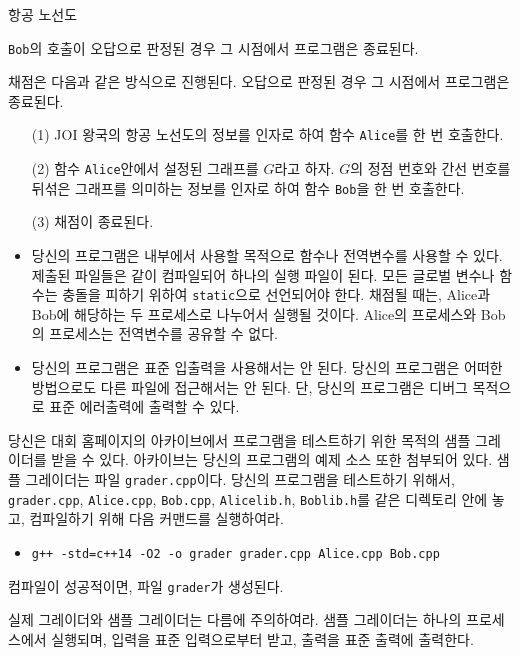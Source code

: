\begin{problem}{항공 노선도}
\begin{itemize}
	\texttt{Bob}의 호출이 오답으로 판정된 경우 그 시점에서 프로그램은 종료된다.
	
\end{itemize}


채점은 다음과 같은 방식으로 진행된다. 오답으로 판정된 경우 그 시점에서 프로그램은 종료된다.

\begin{enumerate}
	\item[(1)] JOI 왕국의 항공 노선도의 정보를 인자로 하여 함수 \texttt{Alice}를 한 번 호출한다.
	\item[(2)] 함수 \texttt{Alice}안에서 설정된 그래프를 $G$라고 하자. $G$의 정점 번호와 간선 번호를 뒤섞은 그래프를 의미하는 정보를 인자로 하여 함수 \texttt{Bob}을 한 번 호출한다.
	\item[(3)] 채점이 종료된다.
\end{enumerate}


\Notes

\begin{itemize}
	\item 당신의 프로그램은 내부에서 사용할 목적으로 함수나 전역변수를 사용할 수 있다. 제출된 파일들은 같이 컴파일되어 하나의 실행 파일이 된다. 모든 글로벌 변수나 함수는 충돌을 피하기 위하여 \texttt{static}으로 선언되어야 한다. 채점될 때는, Alice과 Bob에 해당하는 두 프로세스로 나누어서 실행될 것이다. Alice의 프로세스와 Bob의 프로세스는 전역변수를 공유할 수 없다.
	\item 당신의 프로그램은 표준 입출력을 사용해서는 안 된다. 당신의 프로그램은 어떠한 방법으로도 다른 파일에 접근해서는 안 된다. 단, 당신의 프로그램은 디버그 목적으로 표준 에러출력에 출력할 수 있다.
\end{itemize}

당신은 대회 홈페이지의 아카이브에서 프로그램을 테스트하기 위한 목적의 샘플 그레이더를 받을 수 있다. 아카이브는 당신의 프로그램의 예제 소스 또한 첨부되어 있다.
샘플 그레이더는 파일 \texttt{grader.cpp}이다. 당신의 프로그램을 테스트하기 위해서, \texttt{grader.cpp}, \texttt{Alice.cpp}, \texttt{Bob.cpp}, \texttt{Alicelib.h}, \texttt{Boblib.h}를 같은 디렉토리 안에 놓고, 컴파일하기 위해 다음 커맨드를 실행하여라.

\begin{itemize}
	\item \texttt{g++ -std=c++14 -O2 -o grader grader.cpp Alice.cpp Bob.cpp}
\end{itemize}

컴파일이 성공적이면, 파일 \texttt{grader}가 생성된다.

실제 그레이더와 샘플 그레이더는 다름에 주의하여라. 샘플 그레이더는 하나의 프로세스에서 실행되며, 입력을 표준 입력으로부터 받고, 출력을 표준 출력에 출력한다.


\end{problem}
